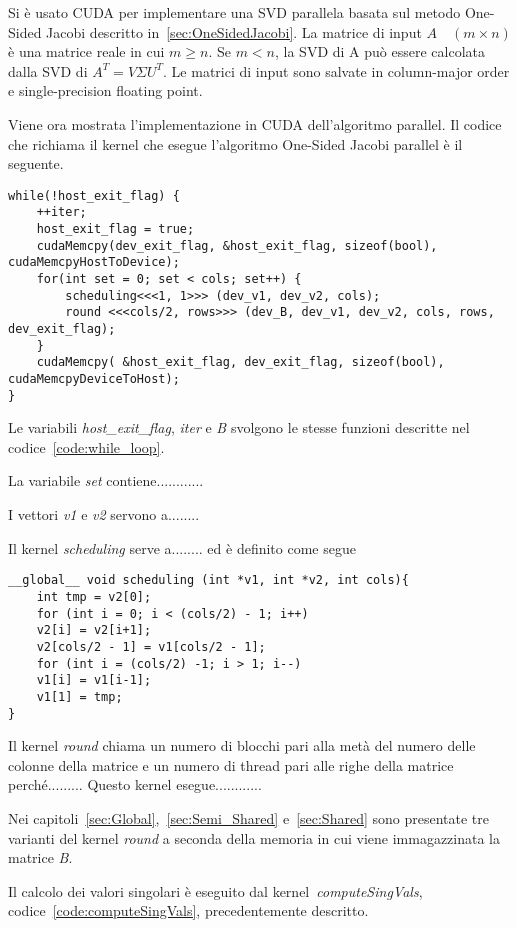 Si è usato CUDA per implementare una SVD parallela basata sul metodo One-Sided Jacobi descritto in~\ref{sec:OneSidedJacobi}. La matrice di input $A \quad (m \times n)$ è una matrice reale in cui $m \geq n$. Se $m < n$, la SVD di A può essere calcolata dalla SVD di $A^T = V \Sigma U^T$. Le matrici di input sono salvate in column-major order e single-precision floating point. \cite{Romer:SVD}

Viene ora mostrata l'implementazione in CUDA dell'algoritmo parallel. Il codice che richiama il kernel che esegue l'algoritmo One-Sided Jacobi parallel è il seguente.
\begin{lstlisting}
while(!host_exit_flag) {
	++iter;
	host_exit_flag = true; 
	cudaMemcpy(dev_exit_flag, &host_exit_flag, sizeof(bool), cudaMemcpyHostToDevice);
	for(int set = 0; set < cols; set++) {
		scheduling<<<1, 1>>> (dev_v1, dev_v2, cols);
		round <<<cols/2, rows>>> (dev_B, dev_v1, dev_v2, cols, rows, dev_exit_flag);		
	}
	cudaMemcpy( &host_exit_flag, dev_exit_flag, sizeof(bool), cudaMemcpyDeviceToHost);
}
\end{lstlisting}
Le variabili \textit{host\_exit\_flag}, \textit{iter} e \textit{B} svolgono le stesse funzioni descritte nel codice~\ref{code:while_loop}.

La variabile \textit{set} contiene............

I vettori \textit{v1} e  \textit{v2} servono a........

Il kernel \textit{scheduling} serve a........ ed è definito come segue
\begin{lstlisting}
__global__ void scheduling (int *v1, int *v2, int cols){
	int tmp = v2[0];
	for (int i = 0; i < (cols/2) - 1; i++)
	v2[i] = v2[i+1];	
	v2[cols/2 - 1] = v1[cols/2 - 1];
	for (int i = (cols/2) -1; i > 1; i--)
	v1[i] = v1[i-1];	
	v1[1] = tmp;
}
\end{lstlisting}

Il kernel \textit{round} chiama un numero di blocchi pari alla metà del numero delle colonne della matrice e un numero di thread pari alle righe della matrice perché......... Questo kernel esegue............

Nei capitoli~\ref{sec:Global},~\ref{sec:Semi_Shared} e~\ref{sec:Shared} sono presentate tre varianti del kernel \textit{round} a seconda della memoria in cui viene immagazzinata la matrice \textit{B}.

Il calcolo dei valori singolari è eseguito dal kernel~\textit{computeSingVals}, codice~\ref{code:computeSingVals}, precedentemente descritto.